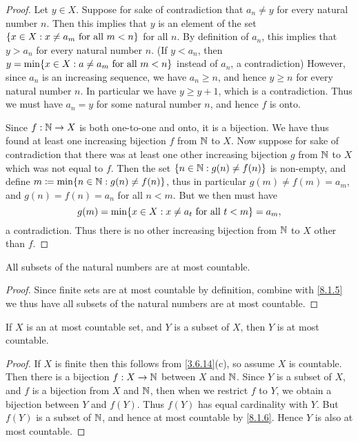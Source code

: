 \begin{proof}
  Let \(y \in X\).
  Suppose for sake of contradiction that \(a_n \neq y\) for every natural number \(n\).
  Then this implies that \(y\) is an element of the set \(\left\lbrace x \in X : x \neq a_m \text{ for all } m < n\right\rbrace\) for all \(n\).
  By definition of \(a_n\), this implies that \(y > a_n\) for every natural number \(n\).
  (If \(y < a_n\), then \(y = \min\set{x \in X : a \neq a_m \text{ for all } m < n}\) instead of \(a_n\), a contradiction)
  However, since \(a_n\) is an increasing sequence, we have \(a_n \geq n\), and hence \(y \geq n\) for every natural number \(n\).
  In particular we have \(y \geq y + 1\), which is a contradiction.
  Thus we must have \(a_n = y\) for some natural number \(n\), and hence \(f\) is onto.

  Since \(f : \mathbb{N} \to X\) is both one-to-one and onto, it is a bijection.
  We have thus found at least one increasing bijection \(f\) from \(\mathbb{N}\) to \(X\).
  Now suppose for sake of contradiction that there was at least one other increasing bijection \(g\) from \(\mathbb{N}\) to \(X\) which was not equal to \(f\).
  Then the set \(\left\lbrace n \in \mathbb{N} : g(n) \neq f(n)\right\rbrace\) is non-empty, and define \(m \coloneqq \min\set{n \in \N : g(n) \neq f(n)}\), thus in particular \(g(m) \neq f(m) = a_m\), and \(g(n) = f(n) = a_n\) for all \(n < m\).
  But we then must have
  \[
    g(m) = \min\set{x \in X : x \neq a_t \text{ for all } t < m} = a_m,
  \]
  a contradiction.
  Thus there is no other increasing bijection from \(\mathbb{N}\) to \(X\) other than \(f\).
\end{proof}

\begin{cor}\label{8.1.6}
  All subsets of the natural numbers are at most countable.
\end{cor}

\begin{proof}
  Since finite sets are at most countable by definition, combine with \cref{8.1.5} we thus have all subsets of the natural numbers are at most countable.
\end{proof}

\begin{cor}\label{8.1.7}
  If \(X\) is an at most countable set, and \(Y\) is a subset of \(X\), then \(Y\) is at most countable.
\end{cor}

\begin{proof}
  If \(X\) is finite then this follows from \cref{3.6.14}(c), so assume \(X\) is countable.
  Then there is a bijection \(f : X \to \mathbb{N}\) between \(X\) and \(\mathbb{N}\).
  Since \(Y\) is a subset of \(X\), and \(f\) is a bijection from \(X\) and \(\mathbb{N}\), then when we restrict \(f\) to \(Y\), we obtain a bijection between \(Y\) and \(f(Y)\).
  Thus \(f(Y)\) has equal cardinality with \(Y\).
  But \(f(Y)\) is a subset of \(\mathbb{N}\), and hence at most countable by \cref{8.1.6}.
  Hence \(Y\) is also at most countable.
\end{proof}

